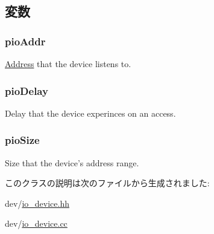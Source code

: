 \subsection{変数}
\hypertarget{classBasicPioDevice_afa7a5450c2bc6f73bc056050c9177193}{
\subsubsection[{pioAddr}]{ {\bf pioAddr}}}
\label{classBasicPioDevice_afa7a5450c2bc6f73bc056050c9177193}
\hyperlink{classAddress}{Address} that the device listens to. \hypertarget{classBasicPioDevice_ac8e969635a78ab9ab123904ccca434cc}{
\subsubsection[{pioDelay}]{ {\bf pioDelay}}}
\label{classBasicPioDevice_ac8e969635a78ab9ab123904ccca434cc}
Delay that the device experinces on an access. \hypertarget{classBasicPioDevice_a390529fe683187c290621e1822e0d5d1}{
\subsubsection[{pioSize}]{ {\bf pioSize}}}
\label{classBasicPioDevice_a390529fe683187c290621e1822e0d5d1}
Size that the device's address range. 

このクラスの説明は次のファイルから生成されました:\begin{DoxyCompactItemize}
\item 
dev/\hyperlink{io__device_8hh}{io\_\-device.hh}\item 
dev/\hyperlink{io__device_8cc}{io\_\-device.cc}\end{DoxyCompactItemize}
